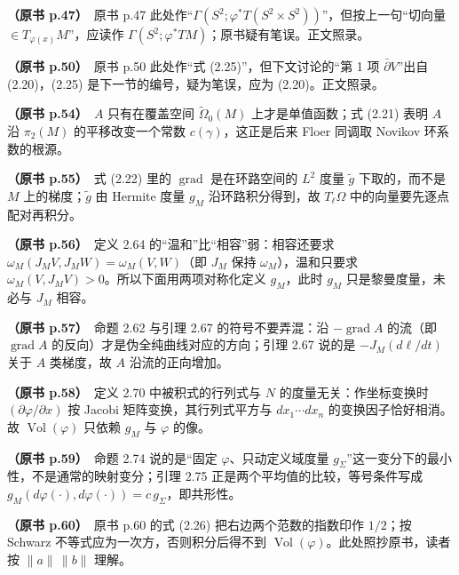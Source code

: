 \noindent \textbf{（原书 p.47）}\ 原书 p.47 此处作“$\Gamma(S^2;\varphi^*T(S^2\times S^2))$”，但按上一句“切向量 $\in T_{\varphi(x)}M$”，应读作 $\Gamma(S^2;\varphi^*TM)$；原书疑有笔误。正文照录。\par\smallskip

\noindent \textbf{（原书 p.50）}\ 原书 p.50 此处作“式 (2.25)”，但下文讨论的“第 1 项 $\bar\partial V$”出自 (2.20)，(2.25) 是下一节的编号，疑为笔误，应为 (2.20)。正文照录。\par\smallskip

\noindent \textbf{（原书 p.54）}\ $A$ 只有在覆盖空间 $\widetilde{\Omega}_0(M)$ 上才是单值函数；式 (2.21) 表明 $A$ 沿 $\pi_2(M)$ 的平移改变一个常数 $c(\gamma)$，这正是后来 Floer 同调取 Novikov 环系数的根源。\par\smallskip

\noindent \textbf{（原书 p.55）}\ 式 (2.22) 里的 $\operatorname{grad}$ 是在环路空间的 $L^2$ 度量 $\tilde g$ 下取的，而不是 $M$ 上的梯度；$\tilde g$ 由 Hermite 度量 $g_M$ 沿环路积分得到，故 $T_\ell\Omega$ 中的向量要先逐点配对再积分。\par\smallskip

\noindent \textbf{（原书 p.56）}\ 定义 2.64 的“温和”比“相容”弱：相容还要求 $\omega_M(J_MV,J_MW)=\omega_M(V,W)$（即 $J_M$ 保持 $\omega_M$），温和只要求 $\omega_M(V,J_MV)>0$。所以下面用两项对称化定义 $g_M$，此时 $g_M$ 只是黎曼度量，未必与 $J_M$ 相容。\par\smallskip

\noindent \textbf{（原书 p.57）}\ 命题 2.62 与引理 2.67 的符号不要弄混：沿 $-\operatorname{grad}A$ 的流（即 $\operatorname{grad}A$ 的反向）才是伪全纯曲线对应的方向；引理 2.67 说的是 $-J_M(d\ell/dt)$ 关于 $A$ 类梯度，故 $A$ 沿流的正向增加。\par\smallskip

\noindent \textbf{（原书 p.58）}\ 定义 2.70 中被积式的行列式与 $N$ 的度量无关：作坐标变换时 $(\partial\varphi/\partial x)$ 按 Jacobi 矩阵变换，其行列式平方与 $dx_1\cdots dx_n$ 的变换因子恰好相消。故 $\operatorname{Vol}(\varphi)$ 只依赖 $g_M$ 与 $\varphi$ 的像。\par\smallskip

\noindent \textbf{（原书 p.59）}\ 命题 2.74 说的是“固定 $\varphi$、只动定义域度量 $g_\Sigma$”这一变分下的最小性，不是通常的映射变分；引理 2.75 正是两个平均值的比较，等号条件写成 $g_M(d\varphi(\cdot),d\varphi(\cdot))=c\,g_\Sigma$，即共形性。\par\smallskip

\noindent \textbf{（原书 p.60）}\ 原书 p.60 的式 (2.26) 把右边两个范数的指数印作 $1/2$；按 Schwarz 不等式应为一次方，否则积分后得不到 $\operatorname{Vol}(\varphi)$。此处照抄原书，读者按 $\|a\|\,\|b\|$ 理解。\par\smallskip

